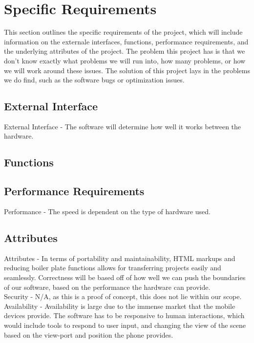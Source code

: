 \documentclass[letterpaper,10pt,titlepage,draftclsnofoot,onecolumn,compsoc,utf8,latin1]{IEEEtran}
\begin{document}
\section{Specific Requirements}
\begin{singlespace}
\noindent
This section outlines the specific requirements of the project, which will include information on the externale interfaces, functions, performance requirements, and the underlying attributes of the project. The problem this project has is that we don't know exactly what problems we will run into, how many problems, or how we will work around these issues. The solution of this project lays in the problems we do find, such as the software bugs or optimization issues.

\subsection{External Interface}
\begin{singlespace}
\noindent
External Interface - The software will determine how well it works between the hardware.
\end{singlespace}

\subsection{Functions}
\begin{singlespace}
\noindent

\end{singlespace}

\subsection{Performance Requirements}
\begin{singlespace}
\noindent
Performance - The speed is dependent on the type of hardware used.
\end{singlespace}

\subsection{Attributes}
\begin{singlespace}
\noindent
Attributes - In terms of portability and maintainability, HTML markups and reducing boiler plate functions allows for transferring projects easily and seamlessly.
Correctness will be based off of how well we can push the boundaries of our software, based on the performance the hardware can provide.\\
Security - N/A, as this is a proof of concept, this does not lie within our scope.\\
Availability - Availability is large due to the immense market that the mobile devices provide. The software has to be responsive to human interactions, which would include tools to respond to user input, and changing the view of the scene based on the view-port and position the phone provides.
\end{singlespace}

\end{singlespace}
\end{document}
